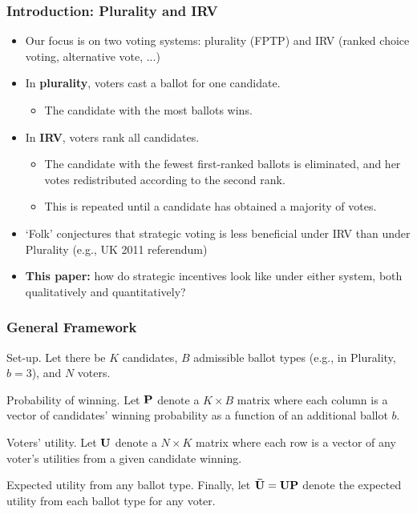 \documentclass[10pt, en-GB]{beamer}
\begin{document}
\begin{frame}[t]\frametitle{Introduction: Plurality and IRV}
    \begin{itemize}[<+->]
    \item Our focus is on two voting systems: plurality (FPTP) and IRV (ranked choice voting, alternative vote, ...)
    \item In \textbf{plurality}, voters cast a ballot for one candidate.
    \begin{itemize}
    	\item The candidate with the most ballots wins.
    \end{itemize}
    \item In \textbf{IRV}, voters rank all candidates. 
    \begin{itemize}
    	\item The candidate with the fewest first-ranked ballots is eliminated, and her votes redistributed according to the second rank.
    	\item This is repeated until a candidate has obtained a majority of votes.
    \end{itemize}
    \item `Folk' conjectures that strategic voting is less beneficial under IRV than under Plurality (e.g., UK 2011 referendum)
    \item \textbf{This paper:} how do strategic incentives look like under either system, both qualitatively and quantitatively?
    \end{itemize}
    \hyperlink{strat_qual}{}
\end{frame}

\begin{frame}[t]\frametitle{General Framework}

\alert{Set-up.} Let there be $K$ candidates, $B$ admissible ballot types (e.g., in Plurality, $b = 3$), and $N$ voters.

\alert{Probability of winning.} Let $\bf P$ denote a $K \times B$ matrix where each column is a vector of candidates' winning probability as a function of an additional ballot $b$.

\alert{Voters' utility.} Let $\bf U$ denote a $N \times K$ matrix where each row is a vector of any voter's utilities from a given candidate winning.

\alert{Expected utility from any ballot type.} Finally, let $\bf \bar{U} = UP$ denote the expected utility from each ballot type for any voter.


\end{frame}
\end{document}
